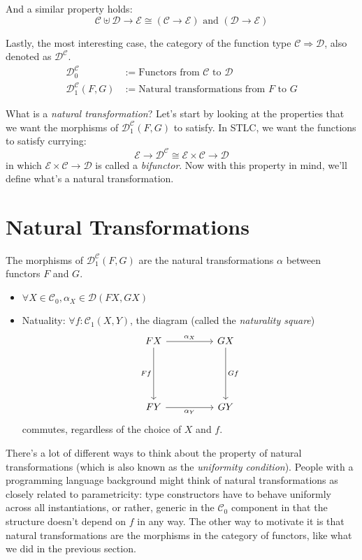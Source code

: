 \documentclass[12pt]{article}
\theoremstyle{plain}
\theoremstyle{definition}
\theoremstyle{remark}
\newcommand{\cat}[1]{\mathcal{#1}}
\begin{document}
And a similar property holds:
\[ \cat{C} \uplus \cat{D} \to \cat{E} \cong (\cat{C} \to \cat{E}) \text{ and } (\cat{D} \to \cat{E}) \]

Lastly, the most interesting case, the category of the function type $\cat{C} \Rightarrow \cat{D}$, also denoted as $\cat{D}^{\cat{C}}$.
\begin{align*}
  \cat{D}^{\cat{C}}_0 &:= \text{Functors from } \cat{C} \text{ to } \cat{D} \\
  \cat{D}^{\cat{C}}_1(F, G) &:= \text{Natural transformations from } F \text{ to } G
\end{align*}

What is a \emph{natural transformation}? Let's start by looking at the properties that we want the morphisms of $\cat{D}^{\cat{C}}_1(F, G)$ to satisfy. In STLC, we want the functions to satisfy currying:
\[ \cat{E} \to \cat{D}^{\cat{C}} \cong \cat{E} \times \cat{C} \to \cat{D} \]
in which \( \cat{E} \times \cat{C} \to \cat{D} \) is called a \emph{bifunctor}. Now with this property in mind, we'll define what's a natural transformation.

\section{Natural Transformations}

The morphisms of $\cat{D}^{\cat{C}}_1(F, G)$ are the natural transformations $\alpha$ between functors $F$ and $G$.
\begin{itemize}
  \item $\forall X \in \cat{C}_0, \alpha_X \in \cat{D}(F X, G X)$
  \item Natuality: $\forall f: \cat{C}_1(X, Y)$, the diagram (called the \emph{naturality square})
    \[\begin{tikzcd}
      FX && GX \\
      \\
      \\
      FY && GY
      \arrow["{\alpha_X}", from=1-1, to=1-3]
      \arrow["Ff"', from=1-1, to=4-1]
      \arrow["Gf", from=1-3, to=4-3]
      \arrow["{\alpha_Y}"', from=4-1, to=4-3]
    \end{tikzcd}\]
  commutes, regardless of the choice of $X$ and $f$.
\end{itemize}

There's a lot of different ways to think about the property of natural transformations (which is also known as the \emph{uniformity condition}). People with a programming language background might think of natural transformations as closely related to parametricity: type constructors have to behave uniformly across all instantiations, or rather, generic in the $\cat{C}_0$ component in that the structure doesn't depend on $f$ in any way. The other way to motivate it is that natural transformations are the morphisms in the category of functors, like what we did in the previous section.
\end{document}
